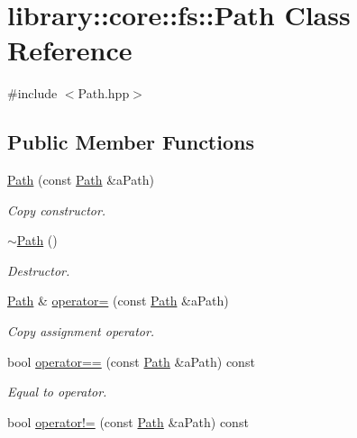 \hypertarget{classlibrary_1_1core_1_1fs_1_1_path}{}\section{library\+:\+:core\+:\+:fs\+:\+:Path Class Reference}
\label{classlibrary_1_1core_1_1fs_1_1_path}


{\ttfamily \#include $<$Path.\+hpp$>$}

\subsection*{Public Member Functions}
\begin{DoxyCompactItemize}
\item 
\hyperlink{classlibrary_1_1core_1_1fs_1_1_path_aabc4240fc08479d1bff6b9753f2b5cc2}{Path} (const \hyperlink{classlibrary_1_1core_1_1fs_1_1_path}{Path} \&a\+Path)
\begin{DoxyCompactList}\small\item\em Copy constructor. \end{DoxyCompactList}\item 
\hyperlink{classlibrary_1_1core_1_1fs_1_1_path_aa120129d701f0b2366d805f73000cbc6}{$\sim$\+Path} ()
\begin{DoxyCompactList}\small\item\em Destructor. \end{DoxyCompactList}\item 
\hyperlink{classlibrary_1_1core_1_1fs_1_1_path}{Path} \& \hyperlink{classlibrary_1_1core_1_1fs_1_1_path_a23879402c7612f8374251613acfe0f62}{operator=} (const \hyperlink{classlibrary_1_1core_1_1fs_1_1_path}{Path} \&a\+Path)
\begin{DoxyCompactList}\small\item\em Copy assignment operator. \end{DoxyCompactList}\item 
bool \hyperlink{classlibrary_1_1core_1_1fs_1_1_path_add705556eb4509ab2868e322490a1e35}{operator==} (const \hyperlink{classlibrary_1_1core_1_1fs_1_1_path}{Path} \&a\+Path) const
\begin{DoxyCompactList}\small\item\em Equal to operator. \end{DoxyCompactList}\item 
bool \hyperlink{classlibrary_1_1core_1_1fs_1_1_path_a79b3a6951753c591bab57ee41f7c4c6f}{operator!=} (const \hyperlink{classlibrary_1_1core_1_1fs_1_1_path}{Path} \&a\+Path) const

\end{DoxyCompactItemize}
